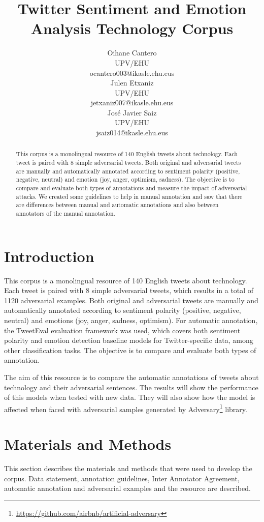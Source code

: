 \documentclass[11pt,a4paper]{article}
\title{Twitter Sentiment and Emotion Analysis Technology Corpus}
\author{Oihane Cantero \\
  UPV/EHU \\
  ocantero003@ikasle.ehu.eus \\\And
  Julen Etxaniz \\
  UPV/EHU \\
  jetxaniz007@ikasle.ehu.eus \\\And
  José Javier Saiz \\
  UPV/EHU \\
  jsaiz014@ikasle.ehu.eus \\}
\date{}
\begin{document}
\maketitle
\begin{abstract}
This corpus is a monolingual resource of 140 English tweets about technology. Each tweet is  paired with 8 simple adversarial tweets. Both original and adversarial tweets are manually and automatically annotated according to sentiment polarity (positive, negative, neutral) and emotion (joy, anger, optimism, sadness). The objective is to compare and evaluate both types of annotations and measure the impact of adversarial attacks. We created some guidelines to help in manual annotation and saw that there are differences between manual and automatic annotations and also between annotators of the manual annotation.
\end{abstract}

\section{Introduction}

This corpus is a monolingual resource of 140 English tweets about technology. Each tweet is  paired with 8 simple adversarial tweets, which results in a total of 1120 adversarial examples. Both original and adversarial tweets are manually and automatically annotated according to sentiment polarity (positive, negative, neutral) and emotions (joy, anger, sadness, optimism). For automatic annotation, the TweetEval \cite{barbieri-etal-2020-tweeteval} evaluation framework was used, which covers both sentiment polarity and emotion detection baseline models for Twitter-specific data, among other classification tasks. The objective is to compare and evaluate both types of annotation.

The aim of this resource is to compare the automatic annotations of tweets about technology and their adversarial sentences. The results will show the performance of this models when tested with new data. They will also show how the model is affected when faced with adversarial samples generated by Adversary\footnote{\url{https://github.com/airbnb/artificial-adversary}} library.

\section{Materials and Methods}

This section describes the materials and methods that were used to develop the corpus. Data statement, annotation guidelines, Inter Annotator Agreement, automatic annotation and adversarial examples and the resource are described.
\end{document}
